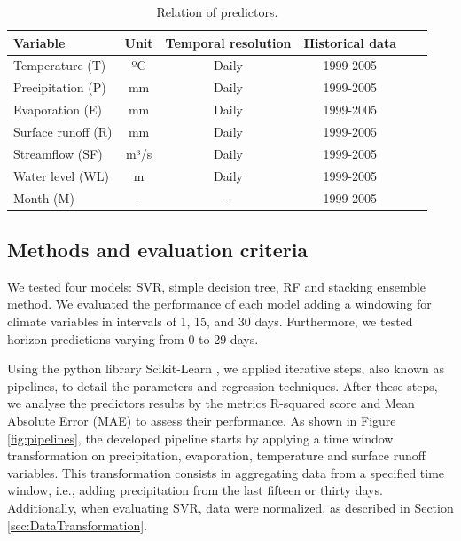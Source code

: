 \documentclass[12pt]{article}
\begin{document}
\begin{table}[htbp]
\centering
\caption{Relation of predictors.}
\label{tab:predictors}
    \renewcommand{\arraystretch}{.8}
    \small\begin{tabulary}{\textwidth}{lcCcCr}
        \toprule
            \normalsize\bfseries{Variable} &
            \normalsize\bfseries{Unit} &
            \normalsize\bfseries{Temporal resolution} &
            \normalsize\bfseries{Historical data}  \\
        \midrule
            Temperature (T)    & ºC   & Daily   & 1999-2005 \\
            Precipitation (P)  & mm   & Daily   & 1999-2005 \\
            Evaporation (E)    & mm   & Daily   & 1999-2005 \\
            Surface runoff (R) & mm   & Daily   & 1999-2005 \\
            Streamflow (SF)    & m³/s & Daily   & 1999-2005 \\
            Water level (WL)   & m    & Daily   & 1999-2005 \\
            Month (M)          & -    & -       & 1999-2005 \\
        \bottomrule
    \end{tabulary}
\end{table}


\subsection{Methods and evaluation criteria}

We tested four models: SVR, simple decision tree, RF and stacking ensemble method. We evaluated the performance of each model adding a windowing for climate variables in intervals of 1, 15, and 30 days. Furthermore, we tested horizon predictions varying from 0 to 29 days.

Using the python library Scikit-Learn \cite{scikit-learn}, we applied iterative steps, also known as pipelines, to detail the parameters and regression techniques. After these steps, we analyse the predictors results by the metrics R-squared score and Mean Absolute Error (MAE) to assess their performance. As shown in Figure \ref{fig:pipelines}, the developed pipeline starts by applying a time window transformation on precipitation, evaporation, temperature and surface runoff variables. This transformation consists in aggregating data from a specified time window, i.e., adding precipitation from the last fifteen or thirty days. Additionally, when evaluating SVR, data were normalized, as described in Section \ref{sec:DataTransformation}.
\end{document}
